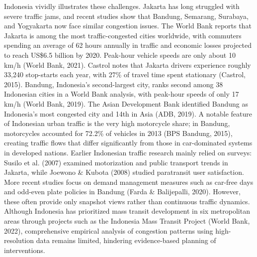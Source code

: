 \documentclass[12pt,a4paper]{article}
\begin{document}
Indonesia vividly illustrates these challenges. Jakarta has long struggled with severe traffic jams, and recent studies show that Bandung, Semarang, Surabaya, and Yogyakarta now face similar congestion issues. The World Bank reports that Jakarta is among the most traffic-congested cities worldwide, with commuters spending an average of 62 hours annually in traffic and economic losses projected to reach US\$6.5 billion by 2020. Peak-hour vehicle speeds are only about 10 km/h (World Bank, 2021). Castrol notes that Jakarta drivers experience roughly 33,240 stop-starts each year, with 27\% of travel time spent stationary (Castrol, 2015). Bandung, Indonesia’s second-largest city, ranks second among 38 Indonesian cities in a World Bank analysis, with peak-hour speeds of only 17 km/h (World Bank, 2019). The Asian Development Bank identified Bandung as Indonesia’s most congested city and 14th in Asia (ADB, 2019). A notable feature of Indonesian urban traffic is the very high motorcycle share; in Bandung, motorcycles accounted for 72.2\% of vehicles in 2013 (BPS Bandung, 2015), creating traffic flows that differ significantly from those in car-dominated systems in developed nations. Earlier Indonesian traffic research mainly relied on surveys: Susilo et al. (2007) examined motorization and public transport trends in Jakarta, while Joewono \& Kubota (2008) studied paratransit user satisfaction. More recent studies focus on demand management measures such as car-free days and odd-even plate policies in Bandung (Farda \& Balijepalli, 2020). However, these often provide only snapshot views rather than continuous traffic dynamics. Although Indonesia has prioritized mass transit development in six metropolitan areas through projects such as the Indonesia Mass Transit Project (World Bank, 2022), comprehensive empirical analysis of congestion patterns using high-resolution data remains limited, hindering evidence-based planning of interventions.
\end{document}
